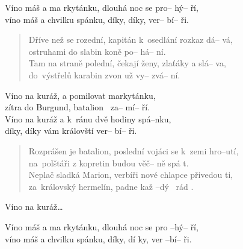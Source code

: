 \begin{song}{}
\begin{deco}
  Víno máš a ma rkytánku, dlouhá noc se pro-- hý-- ří,  \\
   víno máš a chvilku spánku, díky, díky, ver-- bí-- ři. 
\end{deco}
\begin{verse}
  Dříve než se rozední, kapitán k~osedlání rozkaz dá-- vá, \\
   ostruhami do slabin koně po-- há-- ní.  \\
   Tam na straně polední, čekají ženy, zlaťáky a slá-- va, \\
   do~výstřelů karabin zvon už vy-- zvá-- ní. 
\end{verse}
\begin{refren}
   Víno na kuráž, a pomilovat markytánku, \\
   zítra do Burgund, batalion ~za-- mí-- ří.  \\
   Víno na kuráž a k~ránu dvě hodiny spá--nku, \\
   díky, díky vám královští ver-- bí-- ři. 
\end{refren}
\begin{verse}
   Rozprášen je batalion, poslední vojáci se k~zemi hro--utí, \\
   na~polštáři z kopretin budou věč-- ně spá t. \\
   Neplač sladká Marion, verbíři nové chlapce přivedou ti, \\
   za~královský hermelín, padne kaž --dý~ rád .
\end{verse}
\begin{refren}
  Víno na kuráž\ldots %
\end{refren}
\begin{deco}
   Víno máš a ma rkytánku, dlouhá noc se pro --hý-- ří,  \\
   víno máš a chvilku spánku, díky, dí ky, ver --bí-- ři. 
\end{deco}
\end{song}
\pagebreak
